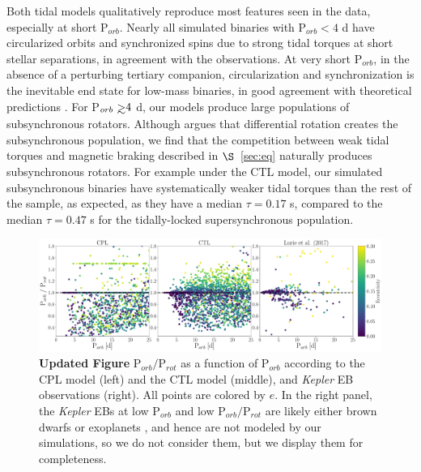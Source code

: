 \documentclass[twocolumn]{aastex61}
\def\gsim{~\rlap{$>$}{\lower 1.0ex\hbox{$\sim$}}}
\newcommand{\xxx}[1]{{\textbf{#1}}}
\newcommand{\kepler}[0]{\textit{Kepler}\xspace}
\begin{document}
Both tidal models qualitatively reproduce most features seen in the \citet{Lurie2017} data, especially at short P$_{orb}$. Nearly all simulated binaries with P$_{orb} < 4$ d have circularized orbits and synchronized spins due to strong tidal torques at short stellar separations, in agreement with the \citet{Lurie2017} observations. At very short P$_{orb}$, in the absence of a perturbing tertiary companion, circularization and synchronization is the inevitable end state for low-mass binaries, in good agreement with theoretical predictions \citep{Counselman1973}. For P$_{orb} \gsim 4$ d, our models produce large populations of subsynchronous rotators. Although \citet{Lurie2017} argues that differential rotation creates the subsynchronous population, we find that the competition between weak tidal torques and magnetic braking described in $\S$~\ref{sec:eq} naturally produces subsynchronous rotators.  For example under the CTL model, our simulated subsynchronous binaries have systematically weaker tidal torques than the rest of the sample, as expected, as they have a median $\tau = 0.17$ s, compared to the median $\tau = 0.47$ s for the tidally-locked supersynchronous population.  
\begin{figure}[t]
	\includegraphics[width=\textwidth]{../Plots/lurieFig7.pdf}
   \caption{\xxx{Updated Figure} P$_{orb}/$P$_{rot}$ as a function of P$_{orb}$ according to the CPL model (left) and the CTL model (middle), and \citet{Lurie2017} \kepler EB observations (right). All points are colored by $e$.  In the right panel, the \kepler EBs at low P$_{orb}$ and low P$_{orb}/$P$_{rot}$ are likely either brown dwarfs or exoplanets \citep{Lurie2017}, and hence are not modeled by our simulations, so we do not consider them, but we display them for completeness.}%
    \label{fig:lurie7}%
\end{figure}
\end{document}
